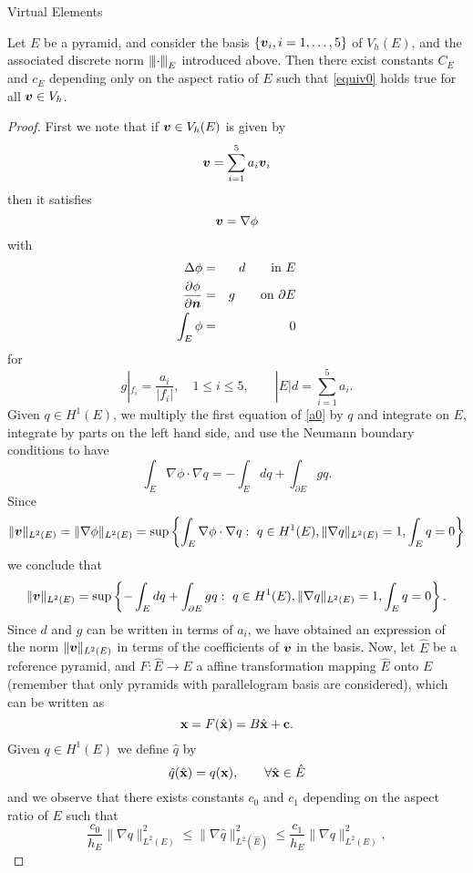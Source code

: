 \begin{chapter}{Virtual Elements}
\begin{proposition}
\label{stabilizing_term}
Let $E$ be a pyramid, and consider the basis $\{\boldsymbol{v}_i, i=1,\ldots,5\}$ of $V_h(E)$, and the associated discrete norm ${\left\vert\kern-0.25ex\left\vert\kern-0.25ex\left\vert \cdot \right\vert\kern-0.25ex\right\vert\kern-0.25ex\right\vert}_E$ introduced above. Then there exist constants $C_E$ and $c_E$ depending only on the aspect ratio of $E$ such that \eqref{equiv0} holds true for all $\boldsymbol{v}\in V_h$.
\end{proposition}
\begin{proof} First we note that if $\boldsymbol{v}\in V_h(E)$ is given by
\[
\boldsymbol{v} = \sum_{i=1}^5a_i\boldsymbol{v}_i
\]
then it satisfies
\[
\boldsymbol{v} = \nabla\phi
\]
with 
\begin{eqnarray}\label{a0}
\Delta\phi &=& d\qquad \mbox{in }E\\ \frac{\partial\phi}{\partial\boldsymbol{n}}&=& g\qquad\mbox{on }\partial E\nonumber\\ \int_E\phi&=&0\nonumber
\end{eqnarray}
for
\begin{equation}\label{ai}
g|_{f_i}=\frac{a_i}{|f_i|},\quad 1\le i\le5, \qquad |E|d=\sum_{i=1}^5a_i.
\end{equation}
Given $q\in H^1(E)$, we multiply  the first equation of \eqref{a0} by $q$ and integrate on $E$, integrate by parts on the left hand side, and use the Neumann boundary conditions to have
\[
\int_E\nabla\phi\cdot\nabla q = -\int_Edq + \int_{\partial E}gq.
\]
Since 
\[
\|\boldsymbol{v}\|_{L^2(E)}=\|\nabla\phi\|_{L^2(E)}=\sup\left\{\int_{E}\nabla\phi\cdot\nabla q: \,\, q\in H^1(E),\|\nabla q\|_{L^2(E)}=1,\int_Eq=0\right\}
\]
we conclude that
\begin{equation}\label{equi0}
\|\boldsymbol{v}\|_{L^2(E)}=\sup\left\{-\int_Edq + \int_{\partial E}gq: \,\, q\in H^1(E),\|\nabla q\|_{L^2(E)}=1,\int_Eq=0\right\}.
\end{equation}
Since $d$ and $g$ can be written in terms of $a_i$, we have obtained an expression of the norm $\|\boldsymbol{v}\|_{L^2(E)}$ in terms of the coefficients of $\boldsymbol{v}$ in the basis.
Now, let $\hat E$ be a reference pyramid, and $F:\hat E\to E$ a affine transformation mapping $\hat E$ onto $E$ (remember that only pyramids with parallelogram basis are considered), which can be written as
\[
{\bf x}=F(\hat{\bf x})=B\hat{\bf x}+{\bf c}.
\] 
Given $q\in H^1(E)$ we define $\hat q$ by
\[
\hat q(\hat{\bf x}) = q({\bf x}),\qquad \forall \hat{\bf x}\in \hat E
\] 
and we observe that there exists constants $c_0$ and $c_1$ depending on the aspect ratio of $E$ such that
\begin{equation}\label{a1}
\frac{c_0}{h_E}\|\nabla q\|_{L^2(E)}^2\le \|\nabla\hat q\|_{L^2(\hat E)}^2\le \frac{c_1}{h_E}\|\nabla q\|_{L^2(E)}^2,

\end{equation}
\end{proof}
\end{chapter}
